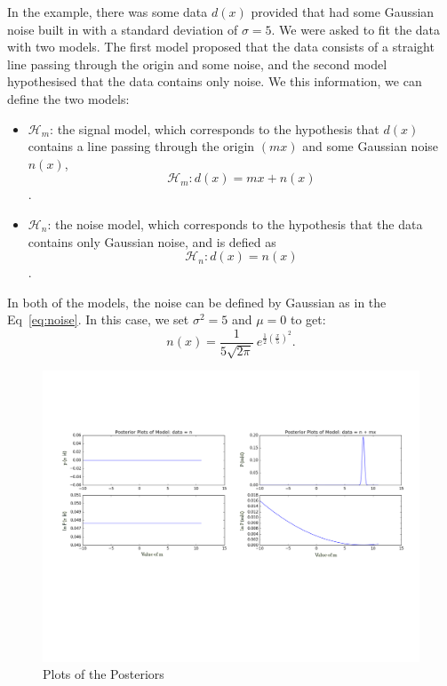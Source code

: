 \documentclass{article}
\begin{document}
 
 In the example, there was some data $d(x)$ provided that had some Gaussian noise built in with a standard deviation of $\sigma = 5$. We were asked to fit the data with two models. The first model proposed that the data consists of a straight line passing through the origin and some noise, and the second model hypothesised that the data contains only noise. We this information, we can define the two models: \\
 \begin{itemize}
 	\item $\mathcal{H}_{m}$: the signal model, which corresponds to the hypothesis that $d(x)$ contains a line passing through the origin $(mx)$ and some Gaussian noise $n(x)$,
 	$$\mathcal{H}_{m}: d(x) = mx + n(x)$$.
 	\item $\mathcal{H}_{n}$: the noise model, which corresponds to the hypothesis that the data contains only Gaussian noise, and is defied as $$\mathcal{H}_{n}: d(x) = n(x)$$.
 \end{itemize}
 
 In both of the models, the noise can be defined by Gaussian as in the Eq~\ref{eq:noise}. In this case, we set $\sigma ^ 2 = 5$ and $\mu = 0$ to get: 
 \begin{equation}\label{eq:noiseMX}
 n(x) = \frac{1}{5 \sqrt{2 \pi} } \ e^{\frac{1}{2} (\frac{x}{5})^2}.
 \end{equation}
 
 

\begin{figure}[h]
	\centering
	\includegraphics[width=1\textwidth]{Figures/exampleMXplot.pdf} 
	\caption{Plots of the Posteriors}
	\label{Fig:exampleMXplot}
\end{figure}
 
\end{document}
